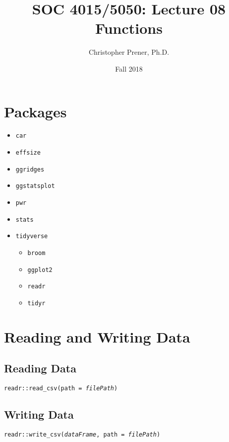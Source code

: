 \documentclass{tufte-handout}
\title{SOC 4015/5050: Lecture 08 Functions}
\author{Christopher Prener, Ph.D.}
\date{Fall 2018}
\newenvironment{subs}
  {\adjustwidth{3em}{0pt}}
  {\endadjustwidth}
\begin{document}
\maketitle %

\vspace{5mm}
\section{Packages}
\begin{itemize}
\item \texttt{car}
\item \texttt{effsize}
\item \texttt{ggridges}
\item \texttt{ggstatsplot}
\item \texttt{pwr}
\item \texttt{stats}
\item \texttt{tidyverse}
\begin{itemize}
\item \texttt{broom}
\item \texttt{ggplot2}
\item \texttt{readr}
\item \texttt{tidyr}
\end{itemize}
\end{itemize}

\vspace{5mm}
\section{Reading and Writing Data}
\begin{subs}
\subsection{Reading Data}
\noindent \texttt{readr::}{\color{red}\texttt{read\_csv}}\texttt{(path = \textit{filePath})}\\

\vspace{3mm}
\subsection{Writing Data}
\noindent \texttt{readr::}{\color{red}\texttt{write\_csv}}\texttt{(\textit{dataFrame}, path = \textit{filePath})}\\
\end{subs}
\end{document}

